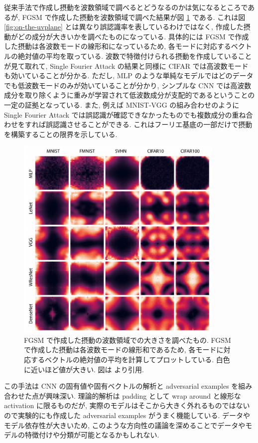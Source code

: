 従来手法で作成し摂動を波数領域で調べるとどうなるのかは気になるところであるが, FGSM で作成した摂動を波数領域で調べた結果が図 \ref{fig:on-the-fgsm} である.
これは図 \ref{fig:on-the-uvplane} とは異なり誤認識率を表しているわけではなく, 作成した摂動がどの成分が大きいかを調べたものになっている.
具体的には FGSM で作成した摂動は各波数モードの線形和になっているため, 各モードに対応するベクトルの絶対値の平均を取っている.
波数で特徴付けられる摂動を作成していることが見て取れて, Single Fourier Attack の結果と同様に CIFAR では高波数モードも効いていることが分かる.
ただし, MLP のような単純なモデルではどのデータでも低波数モードのみが効いていることが分かり, シンプルな CNN では高波数成分を取り除くように重みが学習されて低波数成分が支配的であるということの一定の証拠となっている.
また, 例えば MNIST-VGG の組み合わせのように Single Fourier Attack では誤認識が確認できなかったものでも複数成分の重ね合わせをすれば誤認識させることができる.
これはフーリエ基底の一部だけで摂動を構築することの限界を示している.
%
\begin{figure}[htbp]
\begin{center}
\includegraphics[width=10.0cm]{figures/on-the-fgsm.pdf}
\end{center}
\caption{
FGSM で作成した摂動の波数領域での大きさを調べたもの.
FGSM で作成した摂動は各波数モードの線形和であるため, 各モードに対応するベクトルの絶対値の平均を計算してプロットしている.
白色に近いほど値が大きい.
図は \cite{tsuzuku2019structural} より引用.
}
\label{fig:on-the-fgsm}
\end{figure}
%

この手法は CNN の固有値や固有ベクトルの解析と adversarial examples を組み合わせた点が興味深い.
理論的解析は padding として wrap around と線形な activation に限るものだが, 実際のモデルはそこから大きく外れるものではないので実験的にも作成した adversarial examples がうまく機能している.
データやモデル依存性が大きいため, このような方向性の議論を深めることでデータやモデルの特徴付けや分類が可能となるかもしれない.



